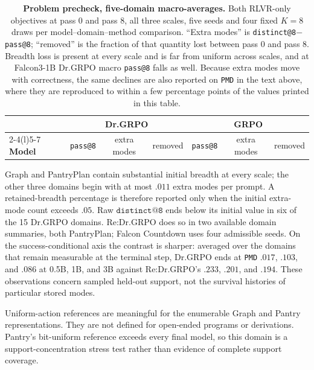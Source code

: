 \documentclass{article}
\makeatletter
\newcommand{\1}{\mathbf 1}
\newcommand{\pmd}{\texttt{PMD}}
\newcommand{\distk}{\texttt{distinct@8}}
\theoremstyle{remark}
\theoremstyle{definition}
\theoremstyle{plain}
\makeatother
\begin{document}
\begin{table}[h]
  \centering
  \caption{\textbf{Problem precheck, five-domain macro-averages.} Both
  RLVR-only objectives at pass 0 and pass 8, all three scales, five seeds
  and four fixed $K=8$ draws per model--domain--method comparison. ``Extra modes'' is
  \distk{}$-$\texttt{pass@8}; ``removed'' is the fraction of that
  quantity lost between pass 0 and pass 8. Breadth loss is present at every
  scale and is far from uniform across scales, and at Falcon3-1B Dr.GRPO
  macro \texttt{pass@8} falls as well. Because extra modes move with
  correctness, the same declines are also reported on \pmd{} in the text above,
  where they are reproduced to within a few percentage points of the values
  printed in this table.}
  \label{tab:baseline-collapse-precheck}
  \small
  \setlength{\tabcolsep}{4.5pt}
  \begin{tabular}{@{}l*{6}{c}@{}}
    \toprule
    & \multicolumn{3}{c}{\textbf{Dr.GRPO}} & \multicolumn{3}{c}{\textbf{GRPO}} \\
    \cmidrule(lr){2-4}\cmidrule(l){5-7}
    \textbf{Model} & \texttt{pass@8} & extra modes & removed
                   & \texttt{pass@8} & extra modes & removed \\
    \midrule
    
  \end{tabular}
\end{table}


Graph and PantryPlan contain substantial initial breadth at every scale;
the other three domains begin with at most $.011$ extra modes per prompt.
A retained-breadth percentage is therefore reported only when the initial
extra-mode count exceeds $.05$. Raw $\texttt{distinct@8}$ ends below its
initial value in six of the 15 Dr.GRPO domains. Re:Dr.GRPO does so in
two available domain summaries, both PantryPlan; Falcon Countdown uses
four admissible seeds. On the success-conditional axis the contrast is
sharper: averaged over the domains that remain measurable at the terminal
step, Dr.GRPO ends at \pmd{} $.017$, $.103$, and $.086$ at 0.5B, 1B, and 3B
against Re:Dr.GRPO's $.233$, $.201$, and $.194$. These observations concern
sampled held-out support, not the survival histories of particular stored
modes.

Uniform-action references are meaningful for the enumerable Graph and
Pantry representations. They are not defined for open-ended programs or
derivations. Pantry's bit-uniform reference exceeds every final model, so
this domain is a support-concentration stress test rather than evidence
of complete support coverage.
\end{document}
